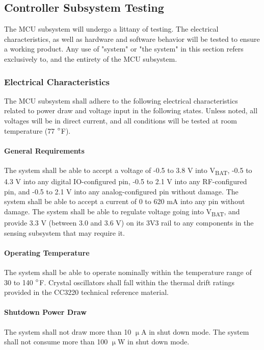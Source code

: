 \subsection{Controller Subsystem Testing}
\label{sec:controller_subsystem_testing}
The MCU subsystem will undergo a littany of testing. The electrical
characteristics, as well as hardware and software behavior will be tested to
ensure a working product. Any use of "system" or "the system" in this section refers exclusively to, and the entirety of the MCU subsystem.

\subsubsection{Electrical Characteristics}
The MCU subsystem shall adhere to the following electrical characteristics
related to power draw and voltage input in the following states. Unless noted,
all voltages will be in direct current, and all conditions will be tested at
room temperature (77 $\degree$F). 

\paragraph{General Requirements} The system shall be able to accept a voltage
of -0.5 to 3.8 V into V\textsubscript{BAT}, -0.5 to 4.3 V into any digital
IO-configured pin, -0.5 to 2.1 V into any RF-configured pin, and -0.5 to 2.1 V
into any analog-configured pin without damage. The system shall be able to
accept a current of 0 to 620 mA into any pin without damage. The system shall
be able to regulate voltage going into V\textsubscript{BAT}, and provide 3.3 V
(between 3.0 and 3.6 V) on its 3V3 rail to any components in the sensing
subsystem that may require it.

\paragraph{Operating Temperature} The system shall be able to operate
nominally within the temperature range of 30 to 140 $\degree$F. Crystal
oscillators shall fall within the thermal drift ratings provided in the
CC3220 technical reference material.

\paragraph{Shutdown Power Draw} The system shall not draw more than 10
$\upmu$A in shut down mode. The system shall not consume more than 100
$\upmu$W in shut down mode.

